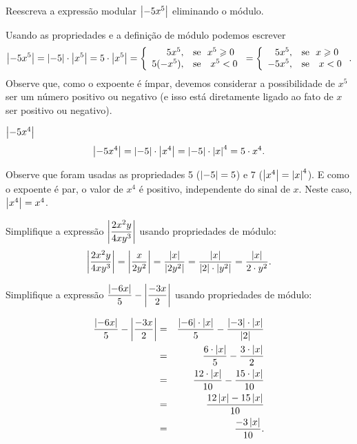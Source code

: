  \begin{exem}
Reescreva a expressão modular $\left|-5x^5\right|$ eliminando o módulo.

Usando as propriedades e a definição de módulo podemos escrever
\begin{equation*}
\left|-5x^5\right|= \left|-5\right|\cdot \left|x^5\right|= 5 \cdot \left|x^5\right| = \left\{ \begin{array}{rl}
        5 x^5, & \text{se} \ \ x^5\geqslant 0 \\
         5 (-x^5), & \text{se } \ \ x^5< 0
     \end{array}\right.
     = \left\{ \begin{array}{rl}
        5 x^5, & \text{se} \ \ x\geqslant 0 \\
         -5x^5, & \text{se } \ \ x< 0
     \end{array}\right..
\end{equation*}
 Observe que, como o expoente é ímpar, devemos considerar a possibilidade de $x^5$ ser um número positivo ou negativo (e isso está diretamente ligado ao fato de $x$ ser positivo ou negativo).
 \end{exem}
 
 \begin{exem}
  $\left|-5x^4\right|$
\begin{equation*}
\left|-5x^4\right|= \left|-5\right|\cdot \left|x^4\right|= \left|-5\right|\cdot \left|x\right|^4 = 5 \cdot x^4.
\end{equation*}

Observe que foram usadas as propriedades 5 ($\left|-5\right| = 5$) e 7 ($\left|x^4\right| = \left|x\right|^4$). E como o expoente é par, o valor de $x^4$ é positivo, independente do sinal de $x$. Neste caso, $\left|x^4\right| = x^4$. 
 \end{exem}
 
 \begin{exem}
  Simplifique a expressão $\left|\dfrac{2x^2y}{4xy^3}\right|$ usando propriedades de módulo:
\begin{equation*}
\left|\dfrac{2x^2y}{4xy^3}\right| = \left|\dfrac{x}{2y^2}\right|= \dfrac{\left|x\right|}{\left|2y^2\right|}= \dfrac{\left|x\right|}{\left|2\right| \cdot \left|y^2\right|}= \frac{\left|x\right|}{2 \cdot y^2}.
\end{equation*}
 \end{exem}
 
 \begin{exem}
 Simplifique a expressão  $\dfrac{\left|-6x\right|}{5} - \left|\dfrac{-3x}{2}\right|$ usando propriedades de módulo:

 \begin{eqnarray*}
  \dfrac{\left|-6x\right|}{5} - \left|\dfrac{-3x}{2}\right| &=&
 \dfrac{\left|-6\right|\cdot \left|x\right|}{5} - \dfrac{\left|-3\right| \cdot \left|x\right|}{\left|2\right|} \\
 &=& \dfrac{6 \cdot \left|x\right|}{5} - \dfrac{ 3 \cdot \left|x\right|}{2} \\
 &=& \dfrac{12 \cdot \left|x\right|}{10} - \dfrac{15 \cdot \left|x\right|}{10} \\
 &=& \dfrac{12\left|x\right| - 15\left|x\right|}{10} \\
 &=& \dfrac{-3\left|x\right|}{10}.
 \end{eqnarray*}

\end{exem}

